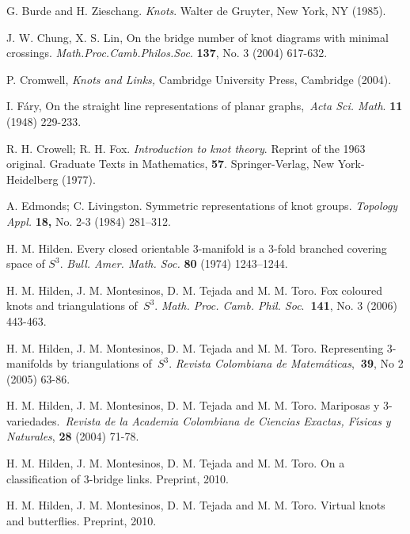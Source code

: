 \documentclass{amsproc}\usepackage{eurosym}
\theoremstyle{plain}
\numberwithin{equation}{section}
\begin{document}
\begin{thebibliography}{99}                                                                                               

G. Burde and H. Zieschang. \textit{Knots}. Walter de Gruyter,
New York, NY (1985).

J. W. Chung, X. S. Lin, On the bridge number of knot diagrams
with minimal crossings. \textit{Math.Proc.Camb.Philos.Soc}. \textbf{137}, No.
3 (2004) 617-632.

P. Cromwell, \textit{Knots and Links, }Cambridge University
Press, Cambridge (2004).

I. F\'{a}ry, On the straight line representations of planar
graphs,\textit{\ Acta Sci. Math}. \textbf{11} (1948) 229-233.

R. H. Crowell; R. H. Fox. \textit{Introduction to knot theory}.
Reprint of the 1963 original. Graduate Texts in Mathematics, \textbf{57}.
Springer-Verlag, New York-Heidelberg (1977).

A. Edmonds; C. Livingston. Symmetric representations of knot
groups. \textit{Topology Appl.} \textbf{18,} No. 2-3 (1984) 281--312.

H. M. Hilden. Every closed orientable 3-manifold is a 3-fold
branched covering space of $S^{3}$. \textit{Bull. Amer. Math. Soc.}
\textbf{80} (1974) 1243--1244.

H. M. Hilden, J. M. Montesinos, D. M. Tejada and M. M. Toro.
Fox coloured knots and triangulations of\textit{\ }$S^{3}$. \textit{Math.
Proc. Camb. Phil. Soc}.\textbf{\ 141}, No. 3 (2006) 443-463.

H. M. Hilden, J. M. Montesinos, D. M. Tejada and M. M. Toro.
Representing 3-manifolds by triangulations of\textit{\ }$S^{3}$.
\textit{Revista Colombiana de Matem\'{a}ticas},\textbf{\ 39}, No 2 (2005) 63-86.

H. M. Hilden, J. M. Montesinos, D. M. Tejada and M. M. Toro.
Mariposas y 3-variedades.\textit{\ Revista de la Academia Colombiana de
Ciencias Exactas, F\'{\i}sicas y Naturales}, \textbf{28} (2004) 71-78.

H. M. Hilden, J. M. Montesinos, D. M. Tejada and M. M. Toro.
On a classification of 3-bridge links. Preprint, 2010.

H. M. Hilden, J. M. Montesinos, D. M. Tejada and M. M. Toro.
Virtual knots and butterflies. Preprint, 2010.


\end{thebibliography}
\end{document}
